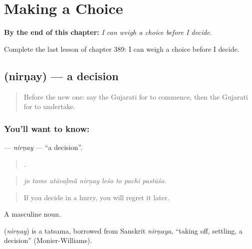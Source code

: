 
\chapter{Making a Choice}
\label{ch:gu-making-a-choice}

\begin{chapteropening}
\textbf{By the end of this chapter:} \emph{I can weigh a choice before I decide.}

Complete the last lesson of chapter 389: I can weigh a choice before I decide.
\end{chapteropening}

\section[\texorpdfstring{\gu{નિર્ણય} (nirṇay)}{નિર્ણય (nirṇay)}]{ (nirṇay) — a decision}

\label{lesson:GU-C389-nirnay}



\begin{quote}
Before the new one: say the Gujarati for to commence, then the Gujarati for to undertake.
\end{quote}

\subsection*{You'll want to know: }
\textbf{} — \emph{nirṇay} — \textquotedblleft{}a decision\textquotedblright{}.

\begin{quote}
       .
\end{quote}

\begin{quote}
\emph{jo tame utāvaḷmā̃ nirṇay leśo to pachī pastāśo.}
\end{quote}

\begin{quote}
If you decide in a hurry, you will regret it later.
\end{quote}

A masculine noun.

\begin{cousinweb}
\textbf{} (\emph{nirṇay}) is a tatsama, borrowed from Sanskrit \emph{nirṇaya}, \textquotedblleft{}taking off, settling, a decision\textquotedblright{} (Monier-Williams).
\end{cousinweb}

